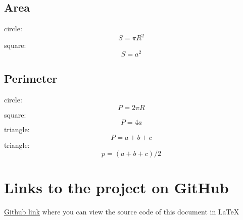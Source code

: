\documentclass[12pt]{article}
\begin{document}
\subsection{Area}
circle: $$S = \pi R^{2}$$
square: $$S = a^{2}$$

\subsection{Perimeter}
circle: $$P = 2 \pi R$$
square: $$P = 4a$$
triangle: $$P = a + b + c$$
triangle: $$p = (a + b + c) / 2$$

\label{subsec:pythagoras}
\newpage
\section{Links to the project on GitHub}
\href{https://github.com/Vadimjus/Latex.git}{Github link} where you can view the source code of this document in LaTeX
\end{document}
